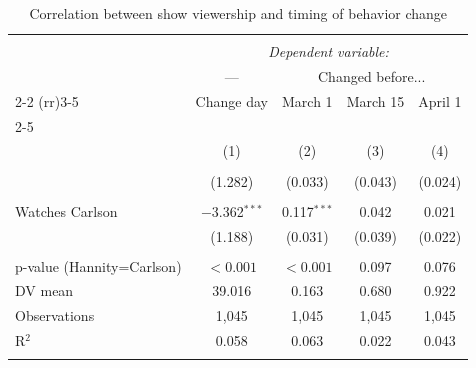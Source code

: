 \begin{table}[!htbp] \centering 
  \caption{Correlation between show viewership and timing of behavior change} 
  \label{t:survey} 
\begin{tabular}{@{\extracolsep{5pt}}lcccc} 
\\[-1.8ex]\hline 
\hline \\[-1.8ex] 
 & \multicolumn{4}{c}{\textit{Dependent variable:}} \\ 
 & --- & \multicolumn{3}{c}{Changed before...} \\
\cmidrule(rr){2-2} \cmidrule(rr){3-5}
& Change day & March 1 & March 15 & April 1 \\
\cmidrule(rr){2-5}
\\[-1.8ex] & (1) & (2) & (3) & (4)\\ 
\hline \\[-1.8ex] 
  & (1.282) & (0.033) & (0.043) & (0.024) \\ 
  & & & & \\ 
 Watches Carlson & $-$3.362$^{***}$ & 0.117$^{***}$ & 0.042 & 0.021 \\ 
  & (1.188) & (0.031) & (0.039) & (0.022) \\ 
  & & & & \\ 
p-value (Hannity=Carlson) &$<0.001$ & $<0.001$ & 0.097 & 0.076\\
\addlinespace
DV mean &39.016&0.163&0.680&0.922\\
\addlinespace
Observations & 1,045 & 1,045 & 1,045 & 1,045 \\ 
R$^{2}$ & 0.058 & 0.063 & 0.022 & 0.043 \\ 
\hline 
\hline \\[-1.8ex] 
\end{tabular} 
\end{table} 
